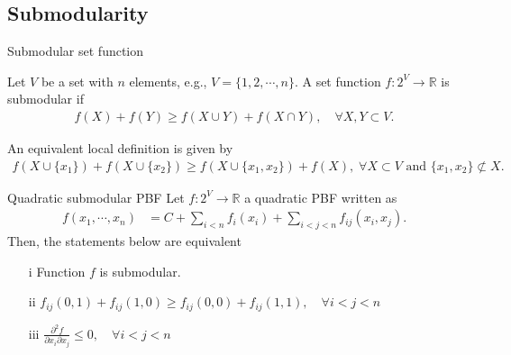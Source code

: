 \subsection{Submodularity}

\begin{definition}{Submodular set function}

Let $V$ be a set with $n$ elements, e.g., $V=\{1,2,\cdots, n\}$. A set function $f:2^V\rightarrow \mathbb{R}$ is submodular if 
\begin{align}
	f(X) + f(Y) \geq f(X \cup Y) + f(X \cap Y),\quad \forall X,Y \subset V.
	\label{ch2:eq:submodular-set-function}
\end{align}
%
\end{definition}
%
An equivalent local definition is given by
\begin{align}
	f(X \cup \{x_1\}) + f(X \cup \{x_2\}) \geq f(X \cup \{x_1,x_2\}) + f(X), \; \forall X \subset V \text{ and } \{x_1,x_2\} \not\subset X.
	\label{ch2:eq:submodular-local}
\end{align}
%
\begin{proposition}{Quadratic submodular PBF}
	Let $f:2^V\rightarrow \mathbb{R}$ a quadratic PBF  written as
	\begin{align*}
		f(x_1,\cdots,x_n) &= C + \sum_{i<n}{f_{i}(x_i)} + \sum_{i<j<n}{f_{ij}(x_i,x_j)}.
	\end{align*}
	Then, the statements below are equivalent
	\begin{itemize}
	 	\item[i]{Function $f$ is submodular.}
		\item[ii]{ $f_{ij}(0,1) + f_{ij}(1,0) \geq f_{ij}(0,0) + f_{ij}(1,1), \quad \forall i<j<n$}
		\item[iii]{ $\frac{\partial^2 f}{\partial x_i\partial x_j} \leq 0, \quad \forall i<j<n$ }
	\end{itemize}
\end{proposition}	
%
